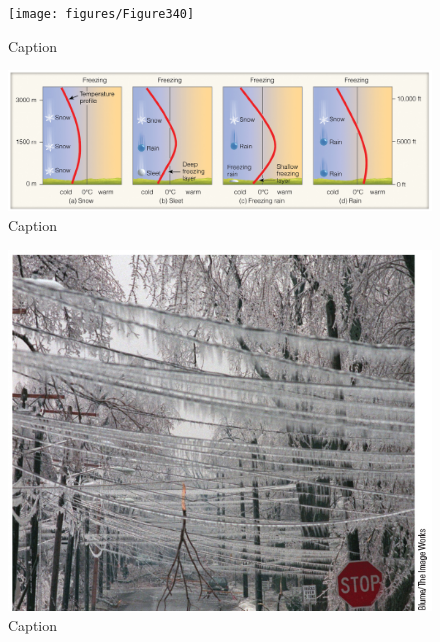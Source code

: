 \documentclass[12pt,oneside]{book}
\begin{document}
\begin{figure}

{\centering \texttt{[image: figures/Figure340]} 

}

\caption{Caption}\label{fig:Sleet2}
\end{figure}

\begin{figure}

{\centering \includegraphics[width=0.9\linewidth]{figures/Figure341} 

}

\caption{Caption}\label{fig:Sleet3}
\end{figure}

\begin{figure}

{\centering \includegraphics[width=0.9\linewidth]{figures/Figure342} 

}

\caption{Caption}\label{fig:Sleet4}
\end{figure}
\end{document}
